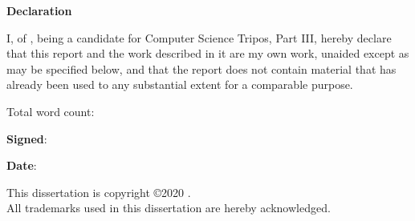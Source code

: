 \newpage
{\Huge \bf Declaration}

\vspace{24pt} 

I, \authorname of \authorcollege, being a candidate for Computer Science Tripos, Part III, hereby declare that this report and the work described in it are my own work, unaided except as may be specified below, and that the report does not contain material that has already been used to any substantial extent for a comparable purpose.

\vspace{24pt}
Total word count: \wordcount

\vspace{60pt}
\textbf{Signed}: 

\vspace{12pt}
\textbf{Date}:


\vfill

This dissertation is copyright \copyright 2020 \authorname. 
\\
All trademarks used in this dissertation are hereby acknowledged.



\newpage
\vspace*{\fill}
